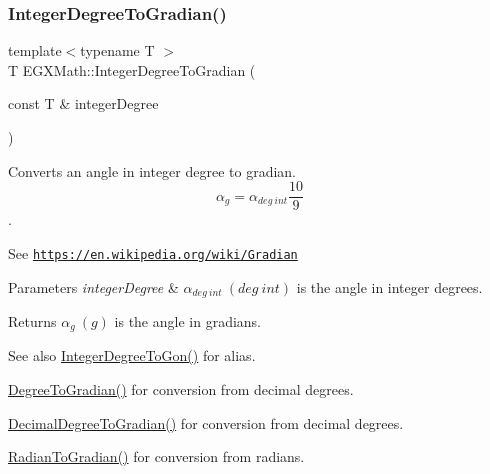 \subsubsection{\texorpdfstring{Integer\+Degree\+To\+Gradian()}{IntegerDegreeToGradian()}}
{\footnotesize\ttfamily template$<$typename T $>$ \\
T E\+G\+X\+Math\+::\+Integer\+Degree\+To\+Gradian (\begin{DoxyParamCaption}\item[{const T \&}]{integer\+Degree }\end{DoxyParamCaption})}



Converts an angle in integer degree to gradian. \[\alpha_{g}=\alpha_{deg\ int}\frac{10}{9}\]. 

See \href{https://en.wikipedia.org/wiki/Gradian}{\tt https\+://en.\+wikipedia.\+org/wiki/\+Gradian} 
\begin{DoxyParams}{Parameters}
{\em integer\+Degree} & $\alpha_{deg\ int}\ (deg\ int)$ is the angle in integer degrees. \\
\hline
\end{DoxyParams}
\begin{DoxyReturn}{Returns}
$\alpha_{g}\ (g)$ is the angle in gradians. 
\end{DoxyReturn}
\begin{DoxySeeAlso}{See also}
\mbox{\hyperlink{group___e_g_x_math-_angle_conversions-_integer_degree_ga6e5be425c37ad27319f09329156c64bb}{Integer\+Degree\+To\+Gon()}} for alias. 

\mbox{\hyperlink{group___e_g_x_math-_angle_conversions-_degree_ga25bb5506b3f66fff7a1b85bf7bd795b3}{Degree\+To\+Gradian()}} for conversion from decimal degrees. 

\mbox{\hyperlink{group___e_g_x_math-_angle_conversions-_decimal_degree_ga3ac6f1ceb36a4938cdf3b55554734c99}{Decimal\+Degree\+To\+Gradian()}} for conversion from decimal degrees. 

\mbox{\hyperlink{group___e_g_x_math-_angle_conversions-_radian_ga3c1607eae50cbf0186c42485bb3878d5}{Radian\+To\+Gradian()}} for conversion from radians. 
\end{DoxySeeAlso}
\mbox{\label{group___e_g_x_math-_angle_conversions-_integer_degree_gae6b79bd5a92f8c6942b9fc2c50695e6a}} 
